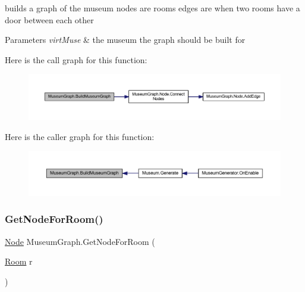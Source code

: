 builds a graph of the museum nodes are rooms edges are when two rooms have a door between each other 


\begin{DoxyParams}{Parameters}
{\em virt\+Muse} & the museum the graph should be built for\\
\hline
\end{DoxyParams}
Here is the call graph for this function\+:
\nopagebreak
\begin{figure}[H]
\begin{center}
\leavevmode
\includegraphics[width=350pt]{class_museum_graph_a36a26248bb9c304f8e67c60eb6d517f5_cgraph}
\end{center}
\end{figure}
Here is the caller graph for this function\+:
\nopagebreak
\begin{figure}[H]
\begin{center}
\leavevmode
\includegraphics[width=350pt]{class_museum_graph_a36a26248bb9c304f8e67c60eb6d517f5_icgraph}
\end{center}
\end{figure}
\mbox{\label{class_museum_graph_a82509a5eb8dd2020aaee17261bedb974}} 
\subsubsection{\texorpdfstring{Get\+Node\+For\+Room()}{GetNodeForRoom()}}
{\footnotesize\ttfamily \mbox{\hyperlink{class_museum_graph_1_1_node}{Node}} Museum\+Graph.\+Get\+Node\+For\+Room (\begin{DoxyParamCaption}\item[{\mbox{\hyperlink{class_room}{Room}}}]{r }\end{DoxyParamCaption})}



